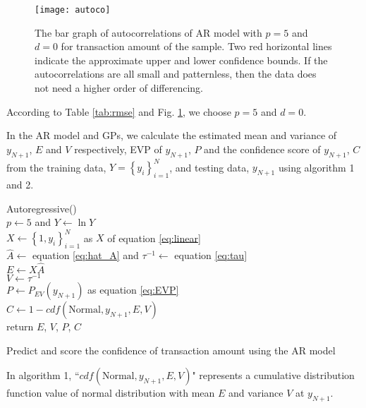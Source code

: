 \documentclass[final,authoryear,5p,times,twocolumn]{elsarticle}
\begin{document}
\begin{figure}[h!]
\centering
\texttt{[image: autoco]}
\caption{The bar graph of autocorrelations of AR model with $p=5$ and $d=0$ for transaction amount of the sample. Two red horizontal lines indicate the approximate upper and lower confidence bounds. If the autocorrelations are all small and patternless, then the data does not need a higher order of differencing.}
\label{fig:autocorrelation}
\end{figure}

According to Table \ref{tab:rmse} and Fig. \ref{fig:autocorrelation}, we choose $p=5$ and $d=0$.

In the AR model and GPs, we calculate the estimated mean and variance of $y_{N+1}$, $E$ and $V$ respectively, EVP of $y_{N+1}$, $P$ and the confidence score of $y_{N+1}$, $C$ from the training data, $Y=\left \{ y_i \right \}_{i=1}^N$, and testing data, $y_{N+1}$ using algorithm 1 and 2.
\begin{algorithm}[h!]
Autoregressive() \\
$p \leftarrow 5$ and $Y \gets \ln Y$\\
$X \leftarrow \left \{ 1, y_i \right \}_{i=1}^N$ as $X$ of equation \eqref{eq:linear} \\
$\hat{A} \leftarrow$ equation \eqref{eq:hat_A} and $\tau^{-1} \leftarrow$ equation \eqref{eq:tau} \\
$E \leftarrow X\hat{A}$ \\
$V \leftarrow \tau^{-1}$ \\
$P \leftarrow P_{EV}(y_{N+1})$ as equation \eqref{eq:EVP} \\
$C \leftarrow 1-cdf(\text{Normal},y_{N+1}, E,V)$ \\
return $E$, $V$, $P$, $C$
\caption{Predict and score the confidence of transaction amount using the AR model}
\end{algorithm}

In algorithm 1, ``$cdf(\text{Normal},y_{N+1}, E,V)$" represents a cumulative distribution function value of normal distribution with mean $E$ and variance $V$ at $y_{N+1}$.
\end{document}
